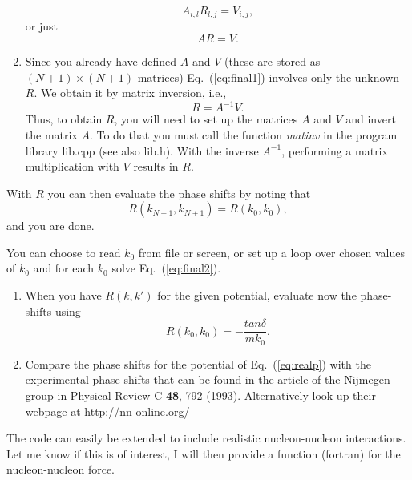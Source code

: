 \documentclass[prc]{revtex4}
\begin{document}
\begin{enumerate}
\begin{equation}
    A_{i,l}R_{l,j}=V_{i,j},
\end{equation} 
or just
\begin{equation}
    AR=V.
    \label{eq:final1}
\end{equation} 
\item Since you already have defined $A$ and $V$
(these are stored as $(N+1)\times (N+1)$ matrices) 
Eq.\ (\ref{eq:final1}) involves only the unknown
$R$. We obtain it by matrix inversion, i.e.,
\begin{equation}
    R=A^{-1}V.
    \label{eq:final2}
\end{equation} 
Thus, to obtain $R$, you will need to set up the matrices
$A$ and $V$ and invert the matrix $A$. To do that
you must call the function
{\em matinv} in the program library lib.cpp (see also lib.h).
With the inverse $A^{-1}$, performing
a matrix multiplication with $V$ results in $R$.
\end{enumerate}

With $R$ you can then evaluate the phase shifts
by noting that 
\begin{equation}
      R(k_{N+1},k_{N+1})=R(k_0,k_0),
\end{equation}
and you are done.

You can choose to read $k_0$ from file or screen, or set up
a loop over chosen values of $k_0$ and for each
$k_0$ solve Eq.\ (\ref{eq:final2}). 



\begin{enumerate}
\item When you have $R(k,k')$ for the given potential, evaluate now the phase-shifts 
using
\[
     R(k_0,k_0)=-\frac{tan\delta}{mk_0}.
\]
\item Compare the phase shifts for the potential of Eq.\ (\ref{eq:realp}) with the 
experimental phase shifts that can be found 
in the article 
of the Nijmegen group in Physical Review C {\bf 48}, 792 (1993).  Alternatively look up their webpage at
\url{http://nn-online.org/}
\end{enumerate}

The code can easily be extended to include realistic nucleon-nucleon interactions.
Let me know if this is of interest, I will then provide a function (fortran) for the nucleon-nucleon force.
\end{document}
